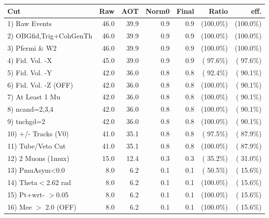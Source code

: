  \begin{table}[h!]\centering
 \begin{tabular}{||l||r|r|r|r|r|r||}
 \hline
 \hline
 Cut & Raw & AOT & Norm0 & Final & Ratio & eff.       \\
 \hline
  1) Raw Events           &         46.0 &         39.9 &          0.9 &          0.9 & (100.0\%) & (100.0\%) \\
  2) OBGfid,Trig+CohGenTh &         46.0 &         39.9 &          0.9 &          0.9 & (100.0\%) & (100.0\%) \\
  3) Pfermi \& W2         &         46.0 &         39.9 &          0.9 &          0.9 & (100.0\%) & (100.0\%) \\
  4) Fid. Vol. -X         &         45.0 &         39.0 &          0.9 &          0.9 & ( 97.6\%) & ( 97.6\%) \\
  5) Fid. Vol. -Y         &         42.0 &         36.0 &          0.8 &          0.8 & ( 92.4\%) & ( 90.1\%) \\
  6) Fid. Vol. -Z (OFF)   &         42.0 &         36.0 &          0.8 &          0.8 & (100.0\%) & ( 90.1\%) \\
  7) At Least 1 Mu        &         42.0 &         36.0 &          0.8 &          0.8 & (100.0\%) & ( 90.1\%) \\
  8) ncand=2,3,4          &         42.0 &         36.0 &          0.8 &          0.8 & (100.0\%) & ( 90.1\%) \\
  9) tnchgd=2             &         42.0 &         36.0 &          0.8 &          0.8 & (100.0\%) & ( 90.1\%) \\
 10) +/- Tracks (V0)      &         41.0 &         35.1 &          0.8 &          0.8 & ( 97.5\%) & ( 87.9\%) \\
 11) Tube/Veto Cut        &         41.0 &         35.1 &          0.8 &          0.8 & (100.0\%) & ( 87.9\%) \\
 12) 2 Muons (1mux)       &         15.0 &         12.4 &          0.3 &          0.3 & ( 35.2\%) & ( 31.0\%) \\
 13) PmuAsym<0.0          &          8.0 &          6.2 &          0.1 &          0.1 & ( 50.5\%) & ( 15.6\%) \\
 14) Theta$<$2.62 rad     &          8.0 &          6.2 &          0.1 &          0.1 & (100.0\%) & ( 15.6\%) \\
 15) Pt+wrt- $>$0.05      &          8.0 &          6.2 &          0.1 &          0.1 & (100.0\%) & ( 15.6\%) \\
 16) Mee $>$ 2.0  (OFF)   &          8.0 &          6.2 &          0.1 &          0.1 & (100.0\%) & ( 15.6\%) \\

\end{tabular}
\end{table}
